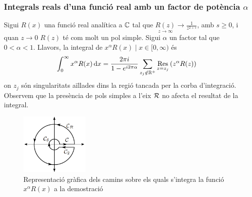 \subsubsection*{Integrals reals d'una funció real amb un factor de potència $\alpha$}
Sigui $R(x)$ una funció real analítica a $\mathbb{C}$ tal que $\displaystyle \underset{z\to \infty}{R(z)} \to \frac{1}{z^{2+s}}$, amb $s \geq 0$, i quan $z \to 0$ $R(z)$ té com molt un pol simple. Sigui $\alpha$ un factor tal que $0 < \alpha < 1$. Llavors, la integral de $x^{\alpha} R(x) \mid x \in [0,\infty)$ és
\begin{align}
    \int_{0}^{\infty} x^{\alpha} R(x) \mathop{}\!\mathrm{d} x = \frac{2\pi i}{1-e^{i 2\pi \alpha}} \sum_{z_{j} \notin \mathbb{R}^{+}} \underset{z=z_{j}}{\operatorname{Res}} \left( z^{\alpha}R(z) \right)
\end{align}
on $z_{j}$ són singularitats aïllades dins la regió tancada per la corba d'integració. Observem que la presència de pols simples a l'eix $\mathcal{R}$ no afecta el resultat de la integral.

\begin{figure}[H]
    \centering
    \includegraphics[width=0.3\textwidth]{./images/graph52}
    \caption{Representació gràfica dels camins sobre els quals s'integra la funció $x^{\alpha} R(x)$ a la demostració}
    \label{fig:graph52}
\end{figure}

